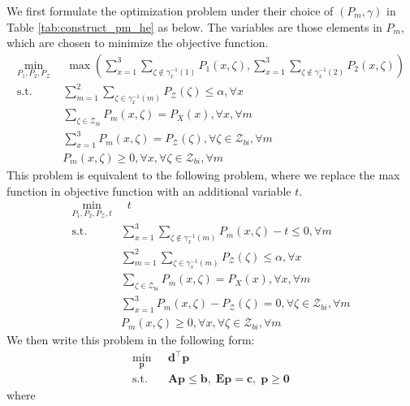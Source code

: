 \documentclass[11pt,letterpaper]{article}
\newcommand{\cZ}{\mathcal{Z}}
\begin{document}
 We first formulate the optimization problem under their choice of  $(P_m,\gamma)$ in Table \ref{tab:construct_pm_he} as below. The variables are those elements in $P_m$, which are chosen to minimize the objective function. 
\begin{align*}
   \min_{P_1,P_2, P_{\cZ}}  \; & \; \max\left( \sum_{x=1}^3 \sum_{ \zeta \notin \gamma^{-1}_x(1)} P_1(x,\zeta), \sum_{x=1}^3 \sum_{ \zeta \notin \gamma^{-1}_x(2)} P_2(x,\zeta)\right) \\
    \text{s.t.} & \sum_{m=1}^2 \sum_{\zeta \in \gamma^{-1}_x(m)} P_{\cZ}(\zeta) \leq \alpha, \forall x  \\
    & \sum_{\zeta \in \cZ_{bi}} P_m(x,\zeta) = P_X(x), \forall x , \forall m \\
    & \sum_{x=1}^3 P_m(x,\zeta) = P_{\cZ}(\zeta), \forall \zeta \in \cZ_{bi}, \forall m \\ 
    & P_m(x,\zeta) \geq 0, \forall x, \forall \zeta \in \cZ_{bi}, \forall m 
\end{align*}
This problem is equivalent to the following problem, where we replace the max function in objective function with an additional variable $t$. 
\begin{align*}
    \min_{P_1,P_2,P_{\cZ},t} & \; \;  t \\
    \text{s.t.} & \sum_{x=1}^3 \sum_{\zeta \notin \gamma^{-1}_x(m)} P_m(x,\zeta) -t \leq 0 , \forall m \\
    & \sum_{m=1}^2 \sum_{\zeta \in \gamma^{-1}_x(m)} P_{\cZ}(\zeta) \leq \alpha, \forall x  \\
    & \sum_{\zeta \in \cZ_{bi}} P_m(x,\zeta) = P_X(x), \forall x, \forall m\\
    & \sum_{x =1}^3 P_m(x,\zeta) - P_{\cZ}(\zeta) = 0, \forall \zeta \in \cZ_{bi}, \forall m \\ 
    & P_m(x,\zeta) \geq 0, \forall x, \forall \zeta \in \cZ_{bi}, \forall m 
\end{align*} 
We then write this problem in the following form: 
\begin{align*}
   \min_{\mathbf{p}}  ~~~ & \mathbf{d}^\intercal \mathbf{p} \\
    \text{s.t.} ~~~ & \mathbf{Ap} \leq \mathbf{b}, \; \mathbf{Ep} = \mathbf{c}, \; \mathbf{p} \geq \mathbf{0}
\end{align*} 
where 
\end{document}
